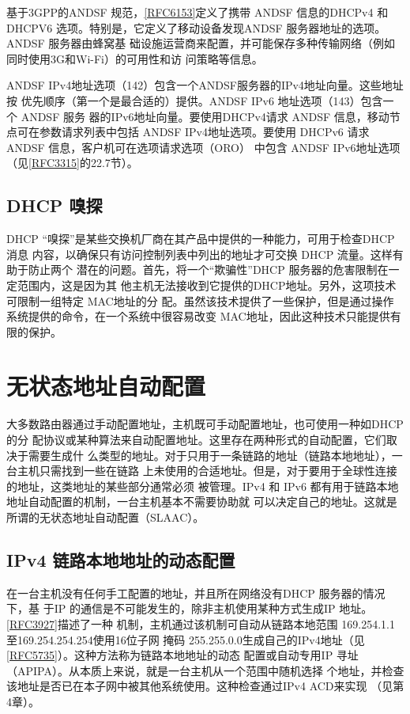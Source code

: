 基于3GPP的ANDSF 规范，\href{https://www.rfc-editor.org/rfc/rfc6153}{\href{https://www.rfc-editor.org/rfc/rfc6153}{[RFC6153]}}定义了携带 ANDSF 信息的DHCPv4 和 DHCPV6
选项。特别是，它定义了移动设备发现ANDSF 服务器地址的选项。ANDSF 服务器由蜂窝基
础设施运营商来配置，并可能保存多种传输网络（例如同时使用3G和Wi-Fi）的可用性和访
问策略等信息。

ANDSF IPv4地址选项（142）包含一个ANDSF服务器的IPv4地址向量。这些地址按
优先顺序（第一个是最合适的）提供。ANDSF IPv6 地址选项（143）包含一个 ANDSF 服务
器的IPv6地址向量。要使用DHCPv4请求 ANDSF 信息，移动节点可在参数请求列表中包括
ANDSF IPv4地址选项。要使用 DHCPv6 请求 ANDSF 信息，客户机可在选项请求选项（ORO）
中包含 ANDSF IPv6地址选项（见\href{https://www.rfc-editor.org/rfc/rfc3315}{\href{https://www.rfc-editor.org/rfc/rfc3315}{[RFC3315]}}的22.7节）。

\subsection{DHCP 嗅探}
DHCP “嗅探”是某些交换机厂商在其产品中提供的一种能力，可用于检查DHCP 消息
内容，以确保只有访问控制列表中列出的地址才可交换 DHCP 流量。这样有助于防止两个
潜在的问题。首先，将一个“欺骗性”DHCP 服务器的危害限制在一定范围内，这是因为其
他主机无法接收到它提供的DHCP地址。另外，这项技术可限制一组特定 MAC地址的分
配。虽然该技术提供了一些保护，但是通过操作系统提供的命令，在一个系统中很容易改变
MAC地址，因此这种技术只能提供有限的保护。

\section{无状态地址自动配置}
大多数路由器通过手动配置地址，主机既可手动配置地址，也可使用一种如DHCP的分
配协议或某种算法来自动配置地址。这里存在两种形式的自动配置，它们取决于需要生成什
么类型的地址。对于只用于一条链路的地址（链路本地地址），一台主机只需找到一些在链路
上未使用的合适地址。但是，对于要用于全球性连接的地址，这类地址的某些部分通常必须
被管理。IPv4 和 IPv6 都有用于链路本地地址自动配置的机制，一台主机基本不需要协助就
可以决定自己的地址。这就是所谓的无状态地址自动配置（SLAAC）。

\subsection{IPv4 链路本地地址的动态配置}
在一台主机没有任何手工配置的地址，并且所在网络没有DHCP 服务器的情况下，基
于IP 的通信是不可能发生的，除非主机使用某种方式生成IP 地址。\href{https://www.rfc-editor.org/rfc/rfc3927}{\href{https://www.rfc-editor.org/rfc/rfc3927}{[RFC3927]}}描述了一种
机制，主机通过该机制可自动从链路本地范围 169.254.1.1 至169.254.254.254使用16位子网
掩码 255.255.0.0生成自己的IPv4地址（见\href{https://www.rfc-editor.org/rfc/rfc5735}{\href{https://www.rfc-editor.org/rfc/rfc5735}{[RFC5735]}}）。这种方法称为链路本地地址的动态
配置或自动专用IP 寻址（APIPA）。从本质上来说，就是一台主机从一个范围中随机选择
个地址，并检查该地址是否已在本子网中被其他系统使用。这种检查通过IPv4 ACD来实现
（见第4章）。

